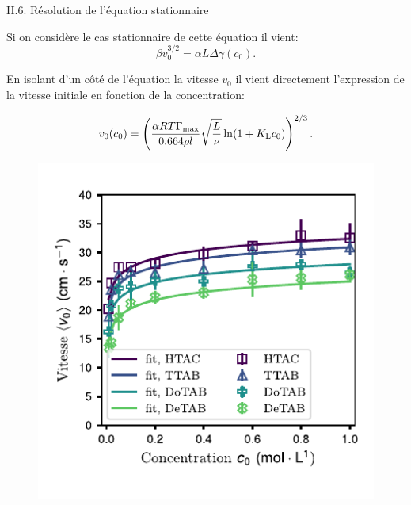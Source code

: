 \documentclass[aspectratio=169,10pt]{beamer}
\begin{document}
    \begin{frame}{II.6. Résolution de l'équation stationnaire}
\begin{minipage}{.5\textwidth}
  Si on considère le cas stationnaire de cette équation il vient:
  \begin{equation}
      \beta v_0^{3/2} = \alpha L\Delta\gamma(c_0).\label{eq:stationnaire}
    \end{equation}
    
    
    En isolant d'un côté de l'équation la vitesse $v_0$ il vient directement l'expression de la vitesse initiale en fonction de la concentration:
   \begin{ombretheo}
    \begin{theo}
    \begin{equation}
      v_0(c_0)=\left(\frac{\alpha RT\Gamma_{\rm max}}{0.664\rho l}\sqrt{\frac{L}{\nu}}\ln(1+K_{\rm L}c_0)\right)^{2/3}.
      \label{eqn:v0}
    \end{equation}
  \end{theo}
\end{ombretheo}
\end{minipage}\hfill
\begin{minipage}{.45\textwidth}
  \begin{figure}
    \includegraphics[width=1\textwidth]{./figures/Bateau_v0_final.pdf}
\end{figure}
\end{minipage}
  \end{frame}
  
\end{document}
